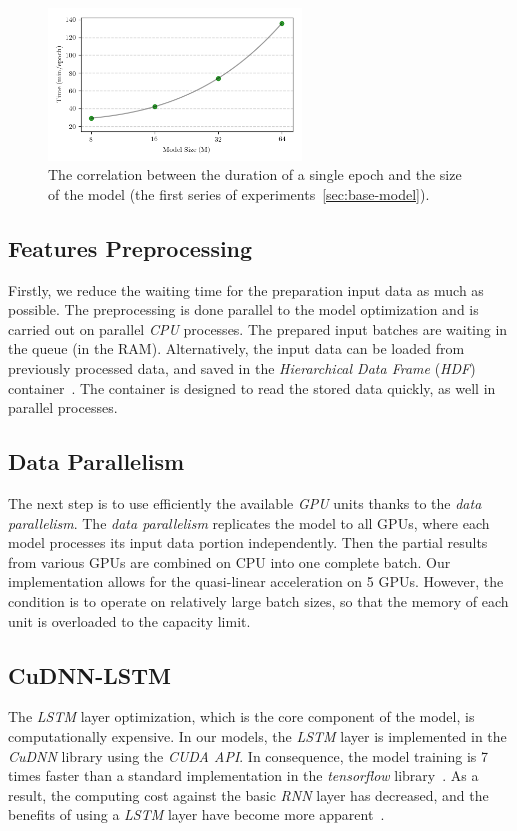 \begin{figure}[h]
    \centering
    \includegraphics[width=0.6\textwidth]{figures/optimization-time.png}
    \caption{
The correlation between the duration of a single epoch and the size of the model (the first series of experiments~\ref{sec:base-model}).
}
    \label{fig:time}
\end{figure}


\subsection*{Features Preprocessing}

Firstly, we reduce the waiting time for the preparation input data as much as possible.
The preprocessing is done parallel to the model optimization and is carried out on parallel \textit{CPU} processes.
The prepared input batches are waiting in the queue (in the RAM).
Alternatively, the input data can be loaded from previously processed data, and saved in
the \textit{Hierarchical Data Frame} (\textit{HDF}) container~\cite{folk2011}.
The container is designed to read the stored data quickly, as well in parallel processes.


\subsection*{Data Parallelism}

The next step is to use efficiently the available \textit{GPU} units thanks to the \textit{data parallelism}.
The \textit{data parallelism} replicates the model to all GPUs, where each model
processes its input data portion independently.
Then the partial results from various GPUs are combined on CPU into one complete batch.
Our implementation allows for the quasi-linear acceleration on 5 GPUs.
However, the condition is to operate on relatively large batch sizes,
so that the memory of each unit is overloaded to the capacity limit.


\subsection*{CuDNN-LSTM}

The \textit{LSTM} layer optimization, which is the core component of the model, is computationally expensive.
In our models, the \textit{LSTM} layer is implemented in the \textit{CuDNN} library using the \textit{CUDA API}.
In consequence, the model training is 7 times faster than a standard implementation in the \textit{tensorflow} library~\cite{abadi2016}.
As a result, the computing cost against the basic \textit{RNN} layer has decreased, and the benefits of
using a \textit{LSTM} layer have become more apparent~\cite{amodei2015}.
